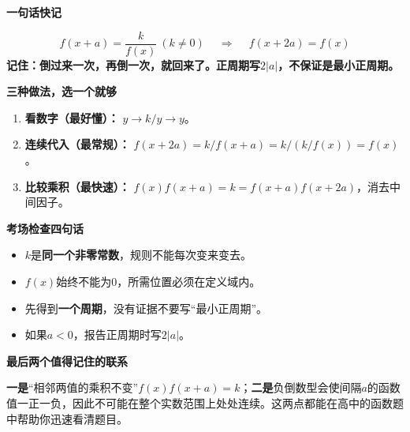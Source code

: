 \clearpage
\begin{summarybox}
\textbf{\textcolor{CSummary}{一句话快记}}

\[
\boxed{\ f(x+a)=\frac{k}{f(x)}\ (k\ne0)\ }
\quad\Longrightarrow\quad
\boxed{\ f(x+2a)=f(x)\ }
\]
\textbf{记住：倒过来一次，再倒一次，就回来了。正周期写$2|a|$，不保证是最小正周期。}

\medskip
\textbf{\textcolor{CSummary}{三种做法，选一个就够}}
\begin{enumerate}[leftmargin=*,itemsep=0.35em]
\item \textbf{看数字（最好懂）：} $y\to k/y\to y$。
\item \textbf{连续代入（最常规）：} $f(x+2a)=k/f(x+a)=k/(k/f(x))=f(x)$。
\item \textbf{比较乘积（最快速）：} $f(x)f(x+a)=k=f(x+a)f(x+2a)$，消去中间因子。
\end{enumerate}

\medskip
\textbf{\textcolor{CSummary}{考场检查四句话}}
\begin{itemize}[leftmargin=*,itemsep=0.35em]
\item $k$是\textbf{同一个非零常数}，规则不能每次变来变去。
\item $f(x)$始终不能为$0$，所需位置必须在定义域内。
\item 先得到\textbf{一个周期}，没有证据不要写“最小正周期”。
\item 如果$a<0$，报告正周期时写$2|a|$。
\end{itemize}

\medskip
\textbf{\textcolor{CSummary}{最后两个值得记住的联系}}

\textbf{一是}“相邻两值的乘积不变”$f(x)f(x+a)=k$；\textbf{二是}负倒数型会使间隔$a$的函数值一正一负，因此不可能在整个实数范围上处处连续。这两点都能在高中的函数题中帮助你迅速看清题目。
\end{summarybox}
